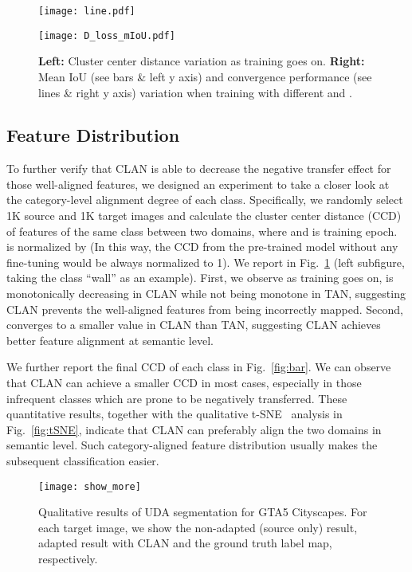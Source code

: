\documentclass[10pt,twocolumn,letterpaper]{article}
\begin{document}
\begin{figure}
\begin{minipage}[b]{.49\linewidth}
\centering
\texttt{[image: line.pdf]}
\end{minipage}
\begin{minipage}[b]{.49\linewidth}
\centering
\texttt{[image: D\_loss\_mIoU.pdf]}
\end{minipage}
\caption{\textbf{Left:} Cluster center distance variation as training goes on. \textbf{Right:} Mean IoU (see bars \& left y axis) and convergence performance (see lines \& right y axis) variation when training with different  and .}
\label{fig:two}
\end{figure}

\subsection{Feature Distribution}
To further verify that CLAN is able to decrease the negative transfer effect for those well-aligned features, we designed an experiment to take a closer look at the category-level alignment degree of each class. Specifically, we randomly select 1K source and 1K target images and calculate the cluster center distance (CCD)  of features of the same class between two domains, where  and  is training epoch.  is normalized by  (In this way, the CCD from the pre-trained model without any fine-tuning would be always normalized to 1). We report  in Fig.~\ref{fig:two} (left subfigure, taking the class ``wall'' as an example). First, we observe as training goes on,  is monotonically decreasing in CLAN while not being monotone in TAN, suggesting CLAN prevents the well-aligned features from being incorrectly mapped. Second,  converges to a smaller value in CLAN than TAN, suggesting CLAN achieves better feature alignment at semantic level. 

We further report the final CCD of each class in Fig.~\ref{fig:bar}. We can observe that CLAN can achieve a smaller CCD in most cases, especially in those infrequent classes which are prone to be negatively transferred. These quantitative results, together with the qualitative t-SNE~\cite{maaten2008tSNE} analysis in Fig.~\ref{fig:tSNE}, indicate that CLAN can preferably align the two domains in semantic level. Such category-aligned feature distribution usually makes the subsequent classification easier.

\begin{figure*}[ht]
\centering
\texttt{[image: show\_more]}
\caption{Qualitative results of UDA segmentation for GTA5  Cityscapes. For each target image, we show the non-adapted (source only) result, adapted result with CLAN and the ground truth label map, respectively.}
\label{fig:result}
\end{figure*}
\end{document}
